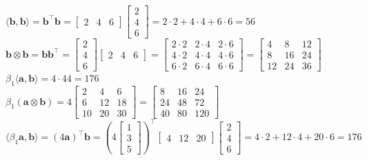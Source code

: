 \documentclass[11pt,letterpaper]{article}
\begin{document}
\begin{enumerate}
\begin{enumerate}
\begin{enumerate}
             $\langle\mathbf{b}, \mathbf{b}\rangle = \mathbf{b}^\top\mathbf{b} = \begin{bmatrix} 2 & 4 & 6 \end{bmatrix} \begin{bmatrix} 2 \\ 4 \\ 6 \end{bmatrix} = 2 \cdot 2 + 4 \cdot 4 + 6 \cdot 6 = 56$\\
             $\mathbf{b} \otimes \mathbf{b} = \mathbf{b}\mathbf{b}^\top = \begin{bmatrix} 2 \\ 4 \\ 6 \end{bmatrix} \begin{bmatrix} 2 & 4 & 6 \end{bmatrix} = \begin{bmatrix} 2 \cdot 2 & 2 \cdot 4 & 2 \cdot 6 \\ 4 \cdot 2 & 4 \cdot 4 & 4 \cdot 6 \\ 6 \cdot 2 & 6 \cdot 4 & 6 \cdot 6 \end{bmatrix} = \begin{bmatrix} 4 & 8 & 12 \\ 8 & 16 & 24 \\ 12 & 24 & 36 \end{bmatrix}$\\
             $\beta_1 \langle\mathbf{a}, \mathbf{b}\rangle = 4 \cdot 44 = 176$\\
             $\beta_1 (\mathbf{a} \otimes \mathbf{b}) = 4 \begin{bmatrix} 2 & 4 & 6 \\ 6 & 12 & 18 \\ 10 & 20 & 30 \end{bmatrix} = \begin{bmatrix} 8 & 16 & 24 \\ 24 & 48 & 72 \\ 40 & 80 & 120 \end{bmatrix}$\\
             $\langle \beta_1 \mathbf{a}, \mathbf{b} \rangle = (4\mathbf{a})^\top \mathbf{b} = \left(4 \begin{bmatrix} 1 \\ 3 \\ 5 \end{bmatrix}\right)^\top \begin{bmatrix} 4 & 12 & 20 \end{bmatrix} \begin{bmatrix} 2 \\ 4 \\ 6 \end{bmatrix} = 4 \cdot 2 + 12 \cdot 4 + 20 \cdot 6 = 176$\\

\end{enumerate}
\end{enumerate}
\end{enumerate}
\end{document}
